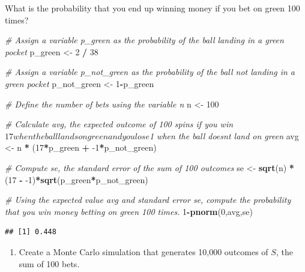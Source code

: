 \documentclass[
]{article}
\newenvironment{Shaded}{\begin{snugshade}}{\end{snugshade}}
\newcommand{\CommentTok}[1]{\textcolor[rgb]{0.56,0.35,0.01}{\textit{#1}}}
\newcommand{\DecValTok}[1]{\textcolor[rgb]{0.00,0.00,0.81}{#1}}
\newcommand{\KeywordTok}[1]{\textcolor[rgb]{0.13,0.29,0.53}{\textbf{#1}}}
\newcommand{\NormalTok}[1]{#1}
\newcommand{\OperatorTok}[1]{\textcolor[rgb]{0.81,0.36,0.00}{\textbf{#1}}}
\newcommand{\StringTok}[1]{\textcolor[rgb]{0.31,0.60,0.02}{#1}}
\providecommand{\tightlist}{%
  \setlength{\itemsep}{0pt}\setlength{\parskip}{0pt}}
\begin{document}
What is the probability that you end up winning money if you bet on
green 100 times?

\begin{Shaded}
\begin{Highlighting}[]
\CommentTok{\# Assign a variable \textasciigrave{}p\_green\textasciigrave{} as the probability of the ball landing in a green pocket}
\NormalTok{p\_green \textless{}{-}}\StringTok{ }\DecValTok{2} \OperatorTok{/}\StringTok{ }\DecValTok{38}

\CommentTok{\# Assign a variable \textasciigrave{}p\_not\_green\textasciigrave{} as the probability of the ball not landing in a green pocket}
\NormalTok{p\_not\_green \textless{}{-}}\StringTok{ }\DecValTok{1}\OperatorTok{{-}}\NormalTok{p\_green}

\CommentTok{\# Define the number of bets using the variable \textquotesingle{}n\textquotesingle{}}
\NormalTok{n \textless{}{-}}\StringTok{ }\DecValTok{100}

\CommentTok{\# Calculate \textquotesingle{}avg\textquotesingle{}, the expected outcome of 100 spins if you win $17 when the ball lands on green and you lose $1 when the ball doesn\textquotesingle{}t land on green}
\NormalTok{avg \textless{}{-}}\StringTok{ }\NormalTok{n }\OperatorTok{*}\StringTok{ }\NormalTok{(}\DecValTok{17}\OperatorTok{*}\NormalTok{p\_green }\OperatorTok{+}\StringTok{ }\DecValTok{{-}1}\OperatorTok{*}\NormalTok{p\_not\_green)}

\CommentTok{\# Compute \textquotesingle{}se\textquotesingle{}, the standard error of the sum of 100 outcomes}
\NormalTok{se \textless{}{-}}\StringTok{ }\KeywordTok{sqrt}\NormalTok{(n) }\OperatorTok{*}\StringTok{ }\NormalTok{(}\DecValTok{17} \OperatorTok{{-}}\StringTok{ }\DecValTok{{-}1}\NormalTok{)}\OperatorTok{*}\KeywordTok{sqrt}\NormalTok{(p\_green}\OperatorTok{*}\NormalTok{p\_not\_green)}

\CommentTok{\# Using the expected value \textquotesingle{}avg\textquotesingle{} and standard error \textquotesingle{}se\textquotesingle{}, compute the probability that you win money betting on green 100 times.}
\DecValTok{1}\OperatorTok{{-}}\KeywordTok{pnorm}\NormalTok{(}\DecValTok{0}\NormalTok{,avg,se)}
\end{Highlighting}
\end{Shaded}

\begin{verbatim}
## [1] 0.448
\end{verbatim}

\begin{enumerate}
\def\labelenumi{\arabic{enumi}.}
\setcounter{enumi}{1}
\tightlist
\item
  Create a Monte Carlo simulation that generates 10,000 outcomes of
  \(S\), the sum of 100 bets.
\end{enumerate}
\end{document}
